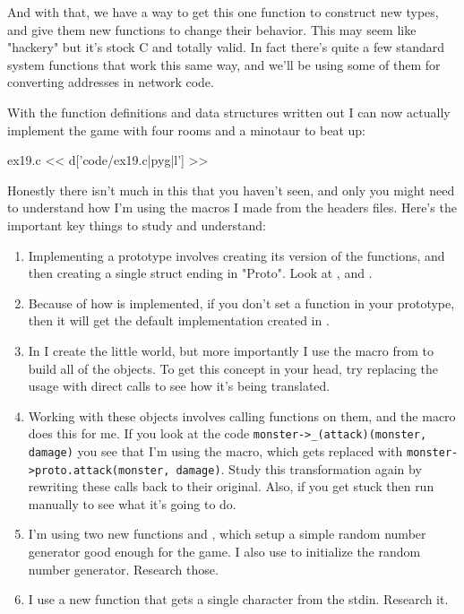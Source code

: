 And with that, we have a way to get this one function to construct new types,
and give them new functions to change their behavior.  This may seem like
"hackery" but it's stock C and totally valid.  In fact there's quite a few
standard system functions that work this same way, and we'll be using some of
them for converting addresses in network code.

With the function definitions and data structures written out I can now
actually implement the game with four rooms and a minotaur to beat up:

\begin{code}{ex19.c}
<< d['code/ex19.c|pyg|l'] >>
\end{code}

Honestly there isn't much in this that you haven't seen, and only you might
need to understand how I'm using the macros I made from the headers files.
Here's the important key things to study and understand:

\begin{enumerate}
\item Implementing a prototype involves creating its version of the
    functions, and then creating a single struct ending in "Proto".
    Look at ,  and .
\item Because of how  is implemented, if you don't set
    a function in your prototype, then it will get the default implementation
    created in .
\item In  I create the little world, but more importantly
    I use the  macro from  to build all of the
    objects.  To get this concept in your head, try replacing the 
    usage with direct  calls to see how it's being
    translated.
\item Working with these objects involves calling functions on them, and the
     macro does this for me.  If you look at the code
    \verb|monster->_(attack)(monster, damage)| you see that I'm using the
    macro, which gets replaced with \verb|monster->proto.attack(monster, damage)|.
    Study this transformation again by rewriting these calls back to their 
    original.  Also, if you get stuck then run  manually to see what it's
    going to do.
\item I'm using two new functions  and , which setup
    a simple random number generator good enough for the game.  I also use
     to initialize the random number generator.  Research those.
\item I use a new function  that gets a single character
    from the stdin.  Research it.
\end{enumerate}


